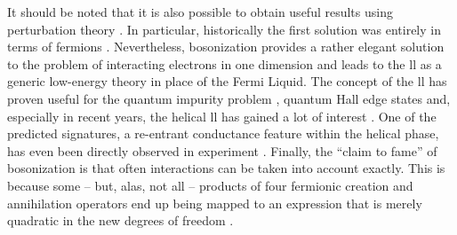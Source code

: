 It should be noted that it is also possible to obtain useful results using perturbation theory \cite[]{FermiLiquid_LL_review_Voit_1995}.
In particular, historically the first solution was entirely in terms of fermions \cite{Parquet_Dzyaloshinskii_1974}.
Nevertheless, bosonization provides a rather elegant solution to the problem of interacting electrons in one dimension and leads to the \gls{ll} as a generic low-energy theory in place of the Fermi Liquid.
The concept of the \gls{ll} has proven useful for the quantum impurity problem \cite{QImpurity_review_Furusaki_2005,QImpurity_LL_Rylands_2016}, quantum Hall edge states \cite{QHallEdgeStates_LL_Wen_1990} and, especially in recent years, the helical \gls{ll} has gained a lot of interest \cite{Helical_ChargeSpinDuality_nonequilibrium_Liu_2011,Helical_Edge_PhononBackscat_Budich_2012,Helical_RashbaImp_RG_Crepin_2012,Helical_RashbaNanowires_LowElectronDensity_Schmidt_2016,Helical_RashbaNanowires_Magnetic_Pedder_2016,Helical_Rashba_SpinOrbit_QSH_Stroem_2010,Helical_SyntheticQWire_Japaridze_2013}. %
One of the predicted signatures, a re-entrant conductance feature within the helical phase, has even been directly observed in experiment \cite{Helical_Experiment_Nanowire_Heedt_2017}.
Finally, the ``claim to fame'' of bosonization is that often interactions can be taken into account exactly.
This is because some -- but, alas, not all -- products of four fermionic creation and annihilation operators end up being mapped to an expression that is merely quadratic in the new degrees of freedom \cite{Bosonization_Schulz_1995,Giamarchi_2004}.
